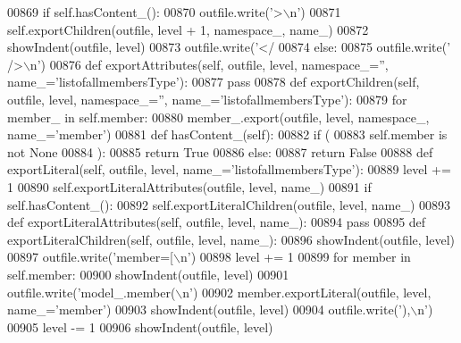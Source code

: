 \begin{DoxyCode}
{{{{{{{{{{{{{{{{{{{{{{{{{{{{{{{{{{{{00869         \textcolor{keywordflow}{if} self.hasContent_():
00870             outfile.write(\textcolor{stringliteral}{'>\(\backslash\)n'})
00871             self.exportChildren(outfile, level + 1, namespace\_, name\_)
00872             showIndent(outfile, level)
00873             outfile.write(\textcolor{stringliteral}{'</%
00874         \textcolor{keywordflow}{else}:
00875             outfile.write(\textcolor{stringliteral}{' />\(\backslash\)n'})
00876     \textcolor{keyword}{def }exportAttributes(self, outfile, level, namespace\_='', name\_='listofallmembersType'):
00877         \textcolor{keywordflow}{pass}
00878     \textcolor{keyword}{def }exportChildren(self, outfile, level, namespace\_='', name\_='listofallmembersType'):
00879         \textcolor{keywordflow}{for} member\_ \textcolor{keywordflow}{in} self.member:
00880             member\_.export(outfile, level, namespace\_, name\_=\textcolor{stringliteral}{'member'})
00881     \textcolor{keyword}{def }hasContent_(self):
00882         \textcolor{keywordflow}{if} (
00883             self.member \textcolor{keywordflow}{is} \textcolor{keywordflow}{not} \textcolor{keywordtype}{None}
00884             ):
00885             \textcolor{keywordflow}{return} \textcolor{keyword}{True}
00886         \textcolor{keywordflow}{else}:
00887             \textcolor{keywordflow}{return} \textcolor{keyword}{False}
00888     \textcolor{keyword}{def }exportLiteral(self, outfile, level, name\_='listofallmembersType'):
00889         level += 1
00890         self.exportLiteralAttributes(outfile, level, name\_)
00891         \textcolor{keywordflow}{if} self.hasContent_():
00892             self.exportLiteralChildren(outfile, level, name\_)
00893     \textcolor{keyword}{def }exportLiteralAttributes(self, outfile, level, name\_):
00894         \textcolor{keywordflow}{pass}
00895     \textcolor{keyword}{def }exportLiteralChildren(self, outfile, level, name\_):
00896         showIndent(outfile, level)
00897         outfile.write(\textcolor{stringliteral}{'member=[\(\backslash\)n'})
00898         level += 1
00899         \textcolor{keywordflow}{for} member \textcolor{keywordflow}{in} self.member:
00900             showIndent(outfile, level)
00901             outfile.write(\textcolor{stringliteral}{'model\_.member(\(\backslash\)n'})
00902             member.exportLiteral(outfile, level, name\_=\textcolor{stringliteral}{'member'})
00903             showIndent(outfile, level)
00904             outfile.write(\textcolor{stringliteral}{'),\(\backslash\)n'})
00905         level -= 1
00906         showIndent(outfile, level)
}}}}}}}}}}}}}}}}}}}}}}}}}}}}}}}}}}}}}
\end{DoxyCode}
